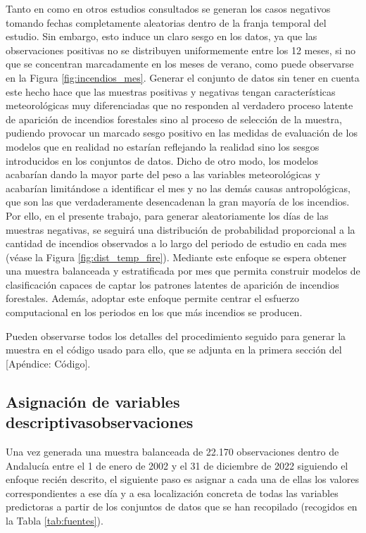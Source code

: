\documentclass[12pt,a4paper,]{book}
\numberwithin{dummy}{section}
\theoremstyle{ocrenumbox}
\theoremstyle{blacknumex}
\theoremstyle{blacknumbox}
\theoremstyle{ocrenum}
\theoremstyle{ocrenum}
\begin{document}
Tanto en \citet{stojanova2012estimating} como en otros estudios
consultados se generan los casos negativos tomando fechas completamente
aleatorias dentro de la franja temporal del estudio. Sin embargo, esto
induce un claro sesgo en los datos, ya que las observaciones positivas
no se distribuyen uniformemente entre los 12 meses, si no que se
concentran marcadamente en los meses de verano, como puede observarse en
la Figura \ref{fig:incendios_mes}. Generar el conjunto de datos sin
tener en cuenta este hecho hace que las muestras positivas y negativas
tengan características meteorológicas muy diferenciadas que no responden
al verdadero proceso latente de aparición de incendios forestales sino
al proceso de selección de la muestra, pudiendo provocar un marcado
sesgo positivo en las medidas de evaluación de los modelos que en
realidad no estarían reflejando la realidad sino los sesgos introducidos
en los conjuntos de datos. Dicho de otro modo, los modelos acabarían
dando la mayor parte del peso a las variables meteorológicas y acabarían
limitándose a identificar el mes y no las demás causas antropológicas,
que son las que verdaderamente desencadenan la gran mayoría de los
incendios. Por ello, en el presente trabajo, para generar aleatoriamente
los días de las muestras negativas, se seguirá una distribución de
probabilidad proporcional a la cantidad de incendios observados a lo
largo del periodo de estudio en cada mes (véase la Figura
\ref{fig:dist_temp_fire}). Mediante este enfoque se espera obtener una
muestra balanceada y estratificada por mes que permita construir modelos
de clasificación capaces de captar los patrones latentes de aparición de
incendios forestales. Además, adoptar este enfoque permite centrar el
esfuerzo computacional en los periodos en los que más incendios se
producen.

Pueden observarse todos los detalles del procedimiento seguido para
generar la muestra en el código usado para ello, que se adjunta en la
primera sección del {[}Apéndice: Código{]}.

\hypertarget{asignaciuxf3n-de-variables-descriptivasobservaciones}{%
\subsection{Asignación de variables
descriptivasobservaciones}\label{asignaciuxf3n-de-variables-descriptivasobservaciones}}

Una vez generada una muestra balanceada de 22.170 observaciones dentro
de Andalucía entre el 1 de enero de 2002 y el 31 de diciembre de 2022
siguiendo el enfoque recién descrito, el siguiente paso es asignar a
cada una de ellas los valores correspondientes a ese día y a esa
localización concreta de todas las variables predictoras a partir de los
conjuntos de datos que se han recopilado (recogidos en la Tabla
\ref{tab:fuentes}).
\end{document}
